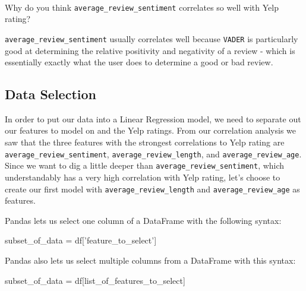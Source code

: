 \documentclass[11pt]{article}
\newenvironment{Shaded}{}{}
\newcommand{\StringTok}[1]{\textcolor[rgb]{0.25,0.44,0.63}{{#1}}}
\newcommand{\NormalTok}[1]{{#1}}
\newcommand{\OperatorTok}[1]{\textcolor[rgb]{0.40,0.40,0.40}{{#1}}}
\begin{document}
    \begin{center}
    \end{center}
    { \hspace*{\fill} \\}
    
    Why do you think \texttt{average\_review\_sentiment} correlates so well
with Yelp rating?

\texttt{average\_review\_sentiment} usually correlates well because
\texttt{VADER} is particularly good at determining the relative
positivity and negativity of a review - which is essentially exactly
what the user does to determine a good or bad review.

    \hypertarget{data-selection}{%
\subsection{Data Selection}\label{data-selection}}

In order to put our data into a Linear Regression model, we need to
separate out our features to model on and the Yelp ratings. From our
correlation analysis we saw that the three features with the strongest
correlations to Yelp rating are \texttt{average\_review\_sentiment},
\texttt{average\_review\_length}, and \texttt{average\_review\_age}.
Since we want to dig a little deeper than
\texttt{average\_review\_sentiment}, which understandably has a very
high correlation with Yelp rating, let's choose to create our first
model with \texttt{average\_review\_length} and
\texttt{average\_review\_age} as features.

Pandas lets us select one column of a DataFrame with the following
syntax:

\begin{Shaded}
\begin{Highlighting}[]
\NormalTok{subset_of_data }\OperatorTok{=}\NormalTok{ df[}\StringTok{'feature_to_select'}\NormalTok{]}
\end{Highlighting}
\end{Shaded}

Pandas also lets us select multiple columns from a DataFrame with this
syntax:

\begin{Shaded}
\begin{Highlighting}[]
\NormalTok{subset_of_data }\OperatorTok{=}\NormalTok{ df[list_of_features_to_select]}
\end{Highlighting}
\end{Shaded}
\end{document}
